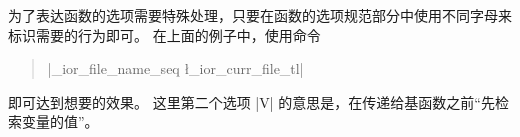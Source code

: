 \documentclass[full]{l3doc}
\begin{document}
%
为了表达函数的选项需要特殊处理，只要在函数的选项规范部分中使用不同字母来标识需要的行为即可。
在上面的例子中，使用命令
\begin{quote}
     |\g_ior_file_name_seq \l_ior_curr_file_tl|
\end{quote}
即可达到想要的效果。
这里第二个选项 |V| 的意思是，在传递给基函数之前“先检索变量的值”。
\end{document}
